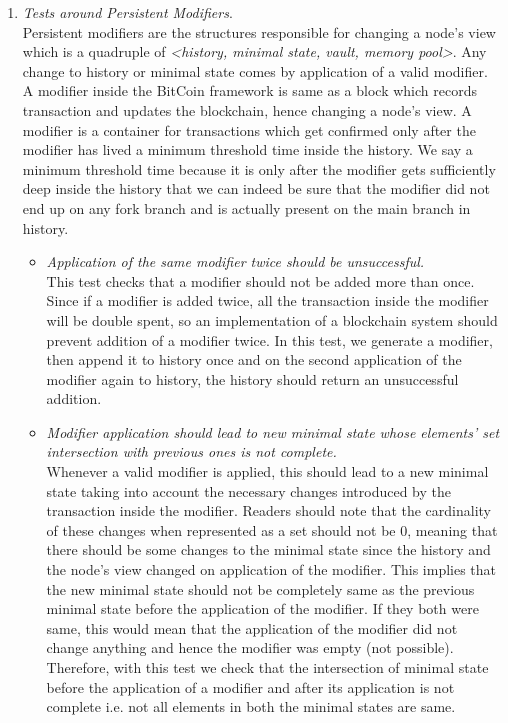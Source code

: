 \begin{enumerate}[\IEEEsetlabelwidth{Z}]
\begin{itemize}[]
\end{itemize}
\item \textit{Tests around Persistent Modifiers}.\\
Persistent modifiers are the structures responsible for changing a node's view which is a quadruple of \textit{<history, minimal state, vault, memory pool>}. Any change to history or minimal state comes by application of a valid modifier. A modifier inside the BitCoin framework is same as a block which records transaction and updates the blockchain, hence changing a node's view. A modifier is a container for transactions which get confirmed only after the modifier has lived a minimum threshold time inside the history. We say a minimum threshold time because it is only after the modifier gets sufficiently deep inside the history that we can indeed be sure that the modifier did not end up on any fork branch and is actually present on the main branch in history.
\begin{itemize}[]
\item \textit{Application of the same modifier twice should be unsuccessful.}\\
This test checks that a modifier should not be added more than once. Since if a modifier is added twice, all the transaction inside the modifier will be double spent, so an implementation of a blockchain system should prevent addition of a modifier twice. In this test, we generate a modifier, then append it to history once and on the second application of the modifier again to history, the history should return an unsuccessful addition.
\item \textit{Modifier application should lead to new minimal state whose elements' set intersection with previous ones is not complete.}\\
Whenever a valid modifier is applied, this should lead to a new minimal state taking into account the necessary changes introduced by the transaction inside the modifier. Readers should note that the cardinality of these changes when represented as a set should not be 0, meaning that there should be some changes to the minimal state since the history and the node's view changed on application of the modifier. This implies that the new minimal state should not be completely same as the previous minimal state before the application of the modifier. If they both were same, this would mean that the application of the modifier did not change anything and hence the modifier was empty (not possible). Therefore, with this test we check that the intersection of minimal state before the application of a modifier and after its application is not complete i.e. not all elements in both the minimal states are same.
\end{itemize}
\end{enumerate}



